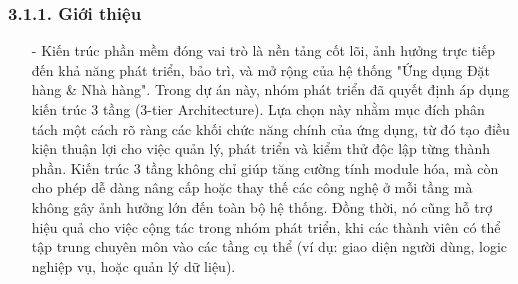 \documentclass[a4paper]{article}
\begin{document}
\subsubsection{3.1.1. Giới thiệu}
\begin{itemize}
    \item[-]Kiến trúc phần mềm đóng vai trò là nền tảng cốt lõi, ảnh hưởng trực tiếp đến khả năng phát triển, bảo trì, và mở rộng của hệ thống "Ứng dụng Đặt hàng \& Nhà hàng". Trong dự án này, nhóm phát triển đã quyết định áp dụng kiến trúc 3 tầng (3-tier Architecture). Lựa chọn này nhằm mục đích phân tách một cách rõ ràng các khối chức năng chính của ứng dụng, từ đó tạo điều kiện thuận lợi cho việc quản lý, phát triển và kiểm thử độc lập từng thành phần. Kiến trúc 3 tầng không chỉ giúp tăng cường tính module hóa, mà còn cho phép dễ dàng nâng cấp hoặc thay thế các công nghệ ở mỗi tầng mà không gây ảnh hưởng lớn đến toàn bộ hệ thống. Đồng thời, nó cũng hỗ trợ hiệu quả cho việc cộng tác trong nhóm phát triển, khi các thành viên có thể tập trung chuyên môn vào các tầng cụ thể (ví dụ: giao diện người dùng, logic nghiệp vụ, hoặc quản lý dữ liệu).
\end{itemize}
\end{document}
